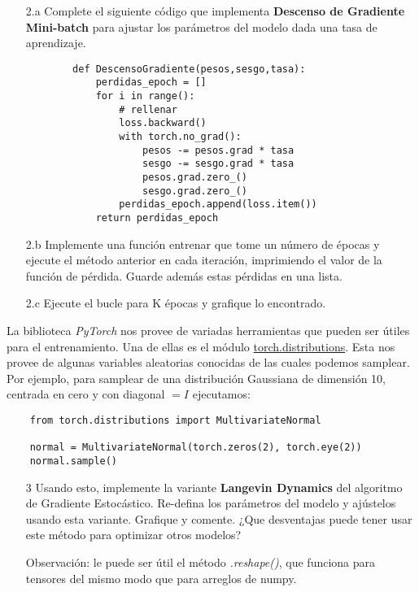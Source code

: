 \begin{enumerate}
	\item[2.a] Complete el siguiente código que implementa \textbf{Descenso de Gradiente Mini-batch} para ajustar los parámetros del modelo dada una tasa de aprendizaje.
	\begin{verbatim}
	    def DescensoGradiente(pesos,sesgo,tasa):
            perdidas_epoch = []
            for i in range():
                # rellenar
                loss.backward()
                with torch.no_grad():
                    pesos -= pesos.grad * tasa
                    sesgo -= sesgo.grad * tasa
                    pesos.grad.zero_()
                    sesgo.grad.zero_()
                perdidas_epoch.append(loss.item())
            return perdidas_epoch
    \end{verbatim}
    \item[2.b] Implemente una función entrenar que tome un número de épocas y ejecute el método anterior en cada iteración, imprimiendo el valor de la función de pérdida. Guarde además estas pérdidas en una lista.
    \item[2.c] Ejecute el bucle para K épocas y grafique lo encontrado.
	
\end{enumerate}

La biblioteca \textit{PyTorch} nos provee de variadas herramientas que pueden ser útiles para el entrenamiento. Una de ellas es el módulo \href{https://pytorch.org/docs/stable/distributions.html}{torch.distributions}. Esta nos provee de algunas variables aleatorias conocidas de las cuales podemos samplear. Por ejemplo, para samplear de una distribución Gaussiana de dimensión 10, centrada en cero y con diagonal $=I$ ejecutamos:
\begin{verbatim}
    from torch.distributions import MultivariateNormal

    normal = MultivariateNormal(torch.zeros(2), torch.eye(2))
    normal.sample()
\end{verbatim}

\begin{itemize}
    \item[3] Usando esto, implemente la variante \textbf{Langevin Dynamics} del algoritmo de Gradiente Estocástico. Re-defina los parámetros del modelo y ajústelos usando esta variante. Grafique y comente. ¿Que desventajas puede tener usar este método para optimizar otros modelos?

    Observación: le puede ser útil el método \textit{.reshape()}, que funciona para tensores del mismo modo que para arreglos de numpy. 
\end{itemize}

